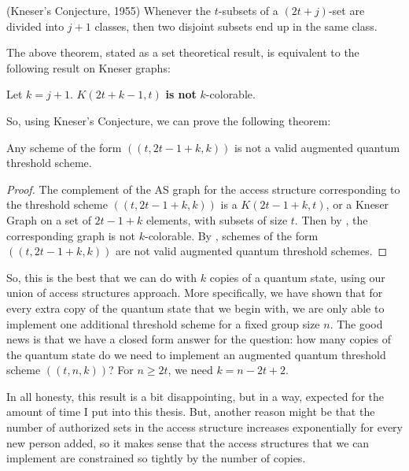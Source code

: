 \begin{theorem}
    \label{thm:kneser-conjecture}
    (Kneser's Conjecture, 1955) Whenever the $t$-subsets of a $(2t+j)$-set are divided into $j+1$ classes, then two disjoint subsets end up in the same class. 
\end{theorem}

The above theorem, stated as a set theoretical result, is equivalent to the following result on Kneser graphs:

\begin{corollary}
    \label{cor:no}
    Let $k=j+1$. $K(2t+k-1,t)$ \textbf{is not} $k$-colorable.
\end{corollary}

So, using Kneser's Conjecture, we can prove the following theorem:

\begin{theorem}
    \label{thm:no-more} 
    Any scheme of the form $((t,2t-1+k,k))$ is not a valid augmented quantum threshold scheme.
\end{theorem}

\begin{proof}
    The complement of the AS graph for the access structure corresponding to the threshold scheme $((t,2t-1+k,k))$ is a $K(2t-1+k,t)$, or a Kneser Graph on a set of $2t-1+k$ elements, with subsets of size $t$. Then by , the corresponding graph is not $k$-colorable. By , schemes of the form $((t,2t-1+k,k))$ are not valid augmented quantum threshold schemes.
\end{proof}

So, this is the best that we can do with $k$ copies of a quantum state, using our union of access structures approach. More specifically, we have shown that for every extra copy of the quantum state that we begin with, we are only able to implement one additional threshold scheme for a fixed group size $n$. The good news is that we have a closed form answer for the question: how many copies of the quantum state do we need to implement an augmented quantum threshold scheme $((t,n,k))$? For $n \geq 2t$, we need $k = n - 2t + 2$.

In all honesty, this result is a bit disappointing, but in a way, expected for the amount of time I put into this thesis. But, another reason might be that the number of authorized sets in the access structure increases exponentially for every new person added, so it makes sense that the access structures that we can implement are constrained so tightly by the number of copies.

